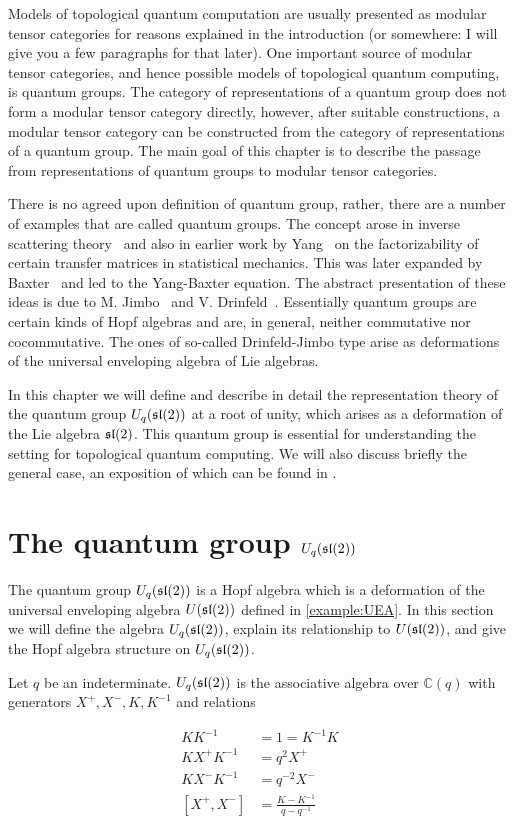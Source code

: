 Models of topological quantum computation are usually presented as modular
tensor categories for reasons explained in the introduction (or somewhere: I
will give you a few paragraphs for that later).  One important source
of modular tensor categories, and hence possible models of topological quantum
computing, is quantum groups.  The category of representations of a quantum
group does not form a modular tensor category directly, however, after suitable
constructions, a modular tensor category can be constructed from the category
of representations of a quantum group.  The main goal of this chapter is to
describe the passage from representations of quantum groups to modular tensor
categories.

There is no agreed upon definition of quantum group, rather, there are a
number of examples that are called quantum groups.  The concept arose in
inverse scattering theory~\cite{Faddeev79} and also in earlier work by
Yang~\cite{Yang67} on the factorizability of certain transfer matrices in
statistical mechanics.  This was later expanded by Baxter~\cite{Baxter82}
and led to the Yang-Baxter equation.  The abstract presentation of these
ideas is due to M. Jimbo~\cite{Jimbo85} and V. Drinfeld~\cite{Drinfeld86}.
Essentially quantum groups are certain kinds of Hopf algebras and are, in
general, neither commutative nor cocommutative.  The ones of so-called
Drinfeld-Jimbo type arise as deformations of the universal enveloping
algebra of Lie algebras.

In this chapter we will define and describe in detail the representation theory
of the quantum group $U_q(\mathfrak{sl}(2))$ at a root of unity, which arises as a
deformation of the Lie algebra $\mathfrak{sl}(2)$. This quantum group is essential for
understanding the setting for topological quantum computing. We will also
discuss briefly the general case, an exposition of which can be found in \cite{CP}.

\section{The quantum group $U_q(\mathfrak{sl}(2))$}
\label{UqSL2}


The quantum group $U_q(\mathfrak{sl}(2))$ is a Hopf algebra which is a deformation of the
universal enveloping algebra $U(\mathfrak{sl}(2))$ defined in \ref{example:UEA}.  In this
section we will define the algebra $U_q(\mathfrak{sl}(2))$, explain its relationship to 
$U(\mathfrak{sl}(2))$, and give the Hopf algebra structure on $U_q(\mathfrak{sl}(2))$.

\begin{defn}
\label{Uqsl2Def}
Let $q$ be an indeterminate. $U_q(\mathfrak{sl}(2))$ is the associative algebra over
$\mathbb{C}(q)$ with generators $X^+,X^-,K, K^{-1}$ and relations 

\begin{align}
    KK^{-1} &= 1 = K^{-1}K \\
    K X^+ K^{-1} &= q^2  X^+  \\
    KX^-K^{-1} &= q^{-2} X^- \\
    [ X^+ ,X^-] &= \frac{K - K^{-1}}{q - q^{-1}}
\end{align}
\end{defn}

